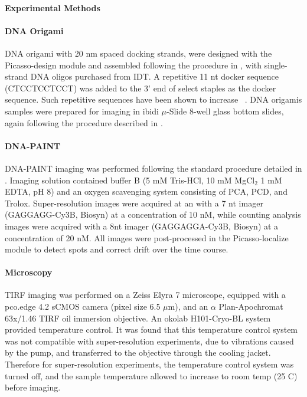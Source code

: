 \paragraph{Experimental Methods}


\paragraph{DNA Origami}
DNA origami with 20 nm spaced docking strands, were designed with the Picasso-design module \cite{schnitzbauer_2017}
and assembled following the procedure in \cite{schnitzbauer_2017}, with single-strand DNA oligos purchased from IDT.
  A repetitive 11 nt docker sequence (CTCCTCCTCCT) was added to the 3' end of select staples as the docker sequence.
  Such repetitive sequences have been shown to increase \pon~\citep{civitci_2020}.
  DNA origamis samples were prepared for imaging in ibidi $\mu$-Slide 8-well glass bottom slides, 
  again following the procedure described in \cite{schnitzbauer_2017}. 
  
\paragraph{DNA-PAINT}
DNA-PAINT imaging was performed following the standard procedure detailed in \cite{schnitzbauer_2017}. 
  Imaging solution contained buffer B (5 mM Tris-HCl, 10 mM MgCl$_2$ 1 mM EDTA, pH 8) and an oxygen scavenging system consisting of PCA, PCD, and Trolox.
  Super-resolution images were acquired at an with a 7 nt imager (GAGGAGG-Cy3B, Biosyn) at a concentration of 10 nM,
  while counting analysis images were acquired with a 8nt imager (GAGGAGGA-Cy3B, Biosyn) at a concentration of 20 nM.
  All images were post-processed in the Picasso-localize module to detect spots and correct drift over the time course. 

\paragraph{Microscopy}

TIRF imaging was performed on a Zeiss Elyra 7 microscope, equipped with 
a pco.edge 4.2 sCMOS camera (pixel size 6.5 $\mu$m), and an $\alpha$ 
Plan-Apochromat 63x/1.46 TIRF oil immersion objective.
  An okolab H101-Cryo-BL system provided temperature control. 
  It was found that this temperature control system was not compatible with super-resolution experiments, 
  due to vibrations caused by the pump, and transferred to the objective through the cooling jacket.
  Therefore for super-resolution experiments, the temperature control system was turned off, 
  and the sample temperature allowed to increase to room temp (25 C) before imaging.